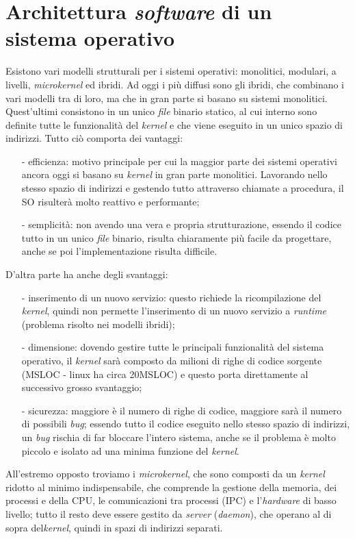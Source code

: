 \section{Architettura \textit{software} di un sistema operativo}
Esistono vari modelli strutturali per i sistemi operativi: monolitici, modulari, a livelli, \textit{microkernel} ed ibridi. Ad oggi i più diffusi sono gli ibridi, che combinano i vari modelli tra di loro, ma che in gran parte si basano su sistemi monolitici. Quest'ultimi consistono in un unico \textit{file} binario statico, al cui interno sono definite tutte le funzionalità del \textit{kernel} e che viene eseguito in un unico spazio di indirizzi. Tutto ciò comporta dei vantaggi: 
\begin{itemize}
	\item[-] efficienza: motivo principale per cui la maggior parte dei sistemi operativi ancora oggi si basano su \textit{kernel} in gran parte monolitici. Lavorando nello stesso spazio di indirizzi e gestendo tutto attraverso chiamate a procedura, il SO risulterà molto reattivo e performante;
	\item[-] semplicità: non avendo una vera e  propria strutturazione, essendo il codice tutto in un unico \textit{file} binario, risulta chiaramente più facile da progettare, anche se poi l'implementazione risulta difficile.
\end{itemize} 
D'altra parte ha anche degli svantaggi: 
\begin{itemize}
	\item[-] inserimento di un nuovo servizio: questo richiede la ricompilazione del \textit{kernel}, quindi non permette l'inserimento di un nuovo servizio a \textit{runtime} (problema risolto nei modelli ibridi);
	\item[-] dimensione: dovendo gestire tutte le principali funzionalità del sistema operativo, il \textit{kernel} sarà composto da milioni di righe di codice sorgente (MSLOC - linux ha circa 20MSLOC) e questo porta direttamente al successivo grosso svantaggio;
	\item[-] sicurezza: maggiore è il numero di righe di codice, maggiore sarà il numero di possibili \textit{bug}; essendo tutto il codice eseguito nello stesso spazio di indirizzi, un \textit{bug} rischia di far bloccare l'intero sistema, anche se il problema è molto piccolo e isolato ad una minima funzione del \textit{kernel}.
\end{itemize}

All'estremo opposto troviamo i \textit{microkernel}, che sono composti da un \textit{kernel} ridotto al minimo indispensabile, che comprende la gestione della memoria, dei processi e della CPU, le comunicazioni tra processi (IPC) e l'\textit{hardware} di basso livello; tutto il resto deve essere gestito da \textit{server} (\textit{daemon}), che operano al di sopra del\textit{kernel}, quindi in spazi di indirizzi separati.

